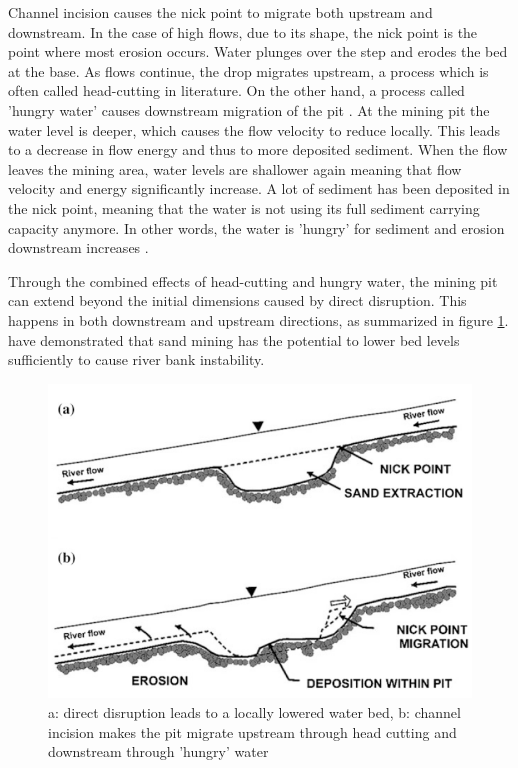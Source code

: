 Channel incision causes the nick point to migrate both upstream and downstream. In the case of high flows, due to its shape, the nick point is the point where most erosion occurs. Water plunges over the step and erodes the bed at the base. As flows continue, the drop migrates upstream, a process which is often called head-cutting in literature. On the other hand, a process called 'hungry water' causes downstream migration of the pit \autocite{sand-mining-boek}. At the mining pit the water level is deeper, which causes the flow velocity to reduce locally. This leads to a decrease in flow energy and thus to more deposited sediment. When the flow leaves the mining area, water levels are shallower again meaning that flow velocity and energy significantly increase. A lot of sediment has been deposited in the nick point, meaning that the water is not using its full sediment carrying capacity anymore. In other words, the water is 'hungry' for sediment and erosion downstream increases \autocite{sand-mining-boek}. 

Through the combined effects of head-cutting and hungry water, the mining pit can extend beyond the initial dimensions caused by direct disruption. This happens in both downstream and upstream directions, as summarized in figure \ref{fig:channelbedeffects}. \textcite{hackneyRiverBankInstability2020} have demonstrated that sand mining has the potential to lower bed levels sufficiently to
cause river bank instability.

\begin{figure}[H]
    \centering
    \includegraphics[width=0.75\linewidth]{figures/channelbedeffects.png}
    \caption{a: direct disruption leads to a locally lowered water bed, b: channel incision makes the pit migrate upstream through head cutting and downstream through 'hungry' water \autocite{sand-mining-boek}}
    \label{fig:channelbedeffects}
\end{figure}

